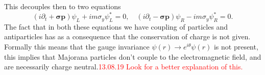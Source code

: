 This decouples then to two equations
\begin{equation}
  (i\partial_t + \bm{\sigma p})\psi_L + im\sigma_y\psi_L^* = 0, \quad
  (i\partial_t - \bm{\sigma p})\psi_R - im\sigma_y\psi_R^* = 0.\label{weylpseudo}
\end{equation}
The fact that in both these equations we have coupling of particles and antiparticles has as a consequence that the conservation of charge is not given. Formally this means that the gauge invariance $\psi(r) \rightarrow e^{i\theta}\psi(r)$ is not present, this implies that Majorana particles don't couple to the electromagnetic field, and are necessarily charge neutral.\textcolor{red}{13.08.19 Look for a better explanation of this.}\\

